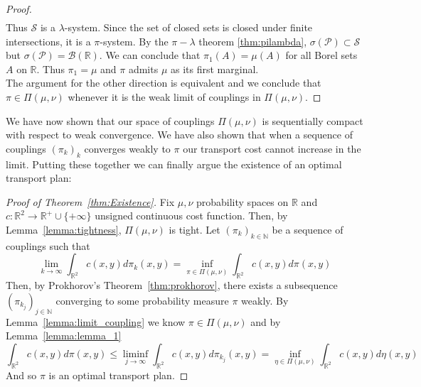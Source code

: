 \documentclass[11pt]{amsart}
\theoremstyle{definition}                  %
\theoremstyle{remark}                      %
\begin{document}
\begin{proof}
\begin{align*}
    \end{align*}
    Thus $\mathcal{S}$ is a  $\lambda$-system. Since the set of closed sets is closed under finite intersections, it is a $\pi$-system.
    By the $\pi-\lambda$ theorem \ref{thm:pilambda}, $\sigma( \mathcal{P}) \subset \mathcal{S}$ but $\sigma(\mathcal{P}) = \mathcal{B}( \mathbb{R})$. We can conclude that
    $\pi_1(A) = \mu(A)$ for all Borel sets $A$ on  $ \mathbb{R}$. Thus $\pi_1 = \mu$ and $\pi$ admits $\mu$ as its first marginal.\\
    The argument for the other direction is equivalent and we conclude that $\pi \in \Pi(\mu, \nu)$ whenever it is the weak limit of couplings in $\Pi(\mu,\nu)$.
\end{proof}

We have now shown that our space of couplings $\Pi(\mu,\nu)$ is sequentially compact with respect
to weak convergence. We have also shown that when a sequence of couplings $(\pi_k)_k$ converges weakly to $\pi$ our transport cost cannot increase in the limit.
Putting these together we can finally argue the existence of an optimal transport plan:


\begin{proof}[Proof of Theorem~\ref{thm:Existence}]
    Fix $\mu,\nu$ probability spaces on $ \mathbb{R}$ and $c : \mathbb{R}^2 \rightarrow \mathbb{R}^{+} \cup \{+ \infty\}$ unsigned continuous cost function.
    Then, by Lemma~\ref{lemma:tightness}, $\Pi(\mu,\nu)$ is tight. Let $(\pi_k)_{k \in \mathbb{N}}$ be a sequence of couplings such that
    \[
        \lim_{k\to \infty} \int_{ \mathbb{R}^2}^{}c(x,y)d\pi_k(x,y) = \inf_{\pi \in \Pi(\mu,\nu)} \int_{ \mathbb{R}^2}^{}c(x,y) d\pi(x,y)
    \] 
    Then, by Prokhorov's Theorem~\ref{thm:prokhorov}, there exists a subsequence $(\pi_{k_j})_{j \in \mathbb{N}}$ converging to some probability measure $\pi$ weakly.
    By Lemma~\ref{lemma:limit_coupling} we know $\pi \in \Pi(\mu,\nu)$ and by Lemma~\ref{lemma:lemma_1}
    \[
        \int_{ \mathbb{R}^2}^{}c(x,y)d\pi(x,y) \le \liminf_{j\to \infty} \int_{ \mathbb{R}^2}^{}c(x,y)d\pi_{k_j}(x,y) = \inf_{\eta \in \Pi(\mu,\nu)} \int_{ \mathbb{R}^2}^{}c(x,y) d\eta(x,y)
    \] 
    And so $\pi$ is an optimal transport plan.
\end{proof}
\end{document}
